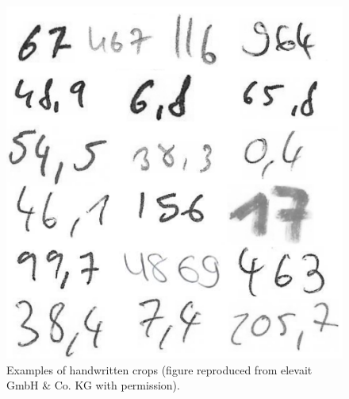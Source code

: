 \begin{figure}
\begin{minipage}[b]{0.4\textwidth}
  \end{minipage}
  \hfill
  \begin{minipage}[b]{0.4\textwidth}
	\includegraphics[width=\textwidth]{images/Introduction/HandwrittenNumbers.png}
    	\caption[Examples of handwritten crops.]{Examples of handwritten crops (figure reproduced from elevait GmbH \& Co. KG with permission). }
    	\label{fig:examplesHandwrittenCrops}
  \end{minipage}
\end{figure}



